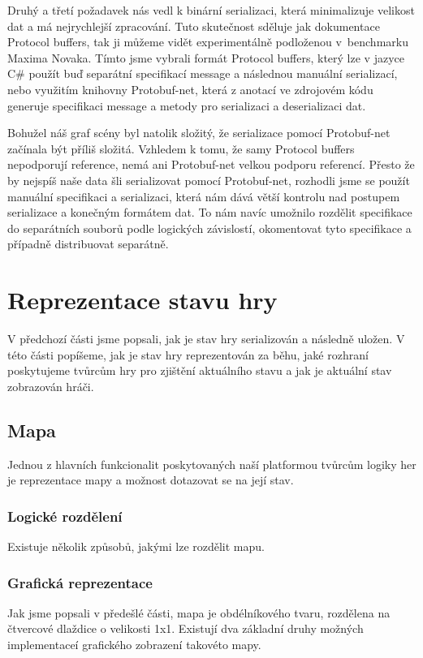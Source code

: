 Druhý a třetí požadavek nás vedl k binární serializaci, která minimalizuje velikost dat a má nejrychlejší zpracování. Tuto skutečnost sděluje jak dokumentace Protocol buffers\citep{site:protobufdevguide}, tak ji můžeme vidět experimentálně podloženou v~benchmarku Maxima Novaka\citep{site:serializationspeed}. Tímto jsme vybrali formát Protocol buffers, který lze v jazyce C\# použít buď separátní specifikací message a následnou manuální serializací, nebo využitím knihovny Protobuf-net, která z anotací ve zdrojovém kódu generuje specifikaci message a  metody pro serializaci a deserializaci dat.

Bohužel náš graf scény byl natolik složitý, že serializace pomocí Protobuf-net začínala být příliš složitá. Vzhledem k tomu, že samy Protocol buffers nepodporují reference, nemá ani Protobuf-net velkou podporu referencí. Přesto že by nejspíš naše data šli serializovat pomocí Protobuf-net, rozhodli jsme se použít manuální specifikaci a serializaci, která nám dává větší kontrolu nad postupem serializace a konečným formátem dat. To nám navíc umožnilo rozdělit specifikace do separátních souborů podle logických závislostí, okomentovat tyto specifikace a případně distribuovat separátně. 


\section{Reprezentace stavu hry}
V předchozí části jsme popsali, jak je stav hry serializován a následně uložen. V této části popíšeme, jak je stav hry reprezentován za běhu, jaké rozhraní poskytujeme tvůrcům hry pro zjištění aktuálního stavu a jak je aktuální stav zobrazován hráči.

\subsection{Mapa}
\label{sec:mapimpl}
Jednou z hlavních funkcionalit poskytovaných naší platformou tvůrcům logiky her je reprezentace mapy a možnost dotazovat se na její stav. 

\subsubsection{Logické rozdělení}
Existuje několik způsobů, jakými lze rozdělit mapu.

\subsubsection{Grafická reprezentace} 
Jak jsme popsali v předešlé části, mapa je obdélníkového tvaru, rozdělena na čtvercové dlaždice o velikosti 1x1. Existují dva základní druhy možných implementaceí grafického zobrazení takovéto mapy.

